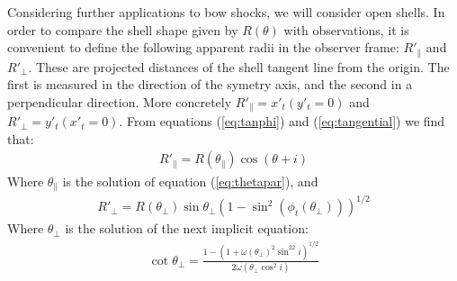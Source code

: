 Considering further applications to bow shocks, we will consider open shells. In order to compare the shell shape given by $R(\theta)$ with observations,
it is convenient to define the following apparent radii in the observer frame: $R'_\parallel$ and $R'_\perp$. These are projected distances of the shell tangent line
from the origin. The first is measured in the direction of the symetry axis, and the second in a perpendicular direction. More concretely $R'_\parallel = x'_t(y'_t=0)$
and $R'_\perp = y'_t(x'_t=0)$. From equations (\ref{eq:tanphi}) and (\ref{eq:tangential}) we find that:
\begin{align}
R'_\parallel = R(\theta_\parallel)\cos(\theta + i) \label{eq:Rpar} 
\end{align}
Where $\theta_\parallel$ is the solution of equation (\ref{eq:thetapar}), and
\begin{align}
R'_\perp = R(\theta_\perp)\sin\theta_\perp\left(1-\sin^2(\phi_t(\theta_\perp))\right)^{1/2}
\end{align}
Where $\theta_\perp$ is the solution of the next implicit equation:
\begin{align}
\cot\theta_\perp = \frac{1-\left(1+\omega(\theta_\perp)^2\sin^22i\right)^{1/2}}{2\omega(\theta_\perp\cos^2 i)}
\end{align}



